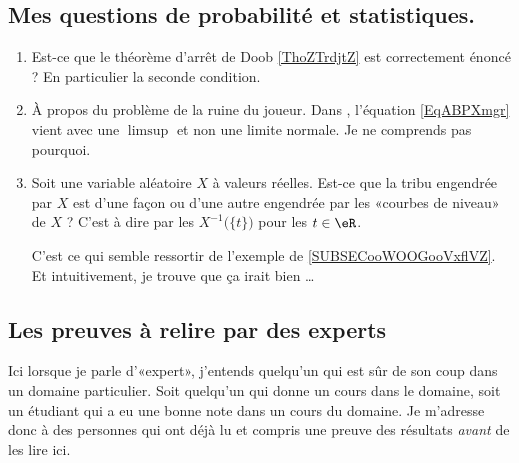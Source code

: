 \subsection{Mes questions de probabilité et statistiques.}

\begin{enumerate}

    \item
        Est-ce que le théorème d'arrêt de Doob \ref{ThoZTrdjtZ} est correctement énoncé ? En particulier la seconde condition. 
    \item
        À propos du problème de la ruine du joueur. Dans \cite{KXjFWKA}, l'équation \eqref{EqABPXmgr} vient avec une \( \limsup\) et non une limite normale. Je ne comprends pas pourquoi.

    \item
        Soit une variable aléatoire \( X\) à valeurs réelles. Est-ce que la tribu engendrée par \( X\) est d'une façon ou d'une autre engendrée par les «courbes de niveau» de \( X\) ? C'est à dire par les \( X^{-1}\big( \{ t \} \big)\) pour les \( t\in \eR\). 

        C'est ce qui semble ressortir de l'exemple de \ref{SUBSECooWOOGooVxflVZ}. Et intuitivement, je trouve que ça irait bien \ldots
\end{enumerate}

 


\subsection{Les preuves à relire par des experts}

Ici lorsque je parle d'«expert», j'entends quelqu'un qui est sûr de son coup dans un domaine particulier. Soit quelqu'un qui donne un cours dans le domaine, soit un étudiant qui a eu une bonne note dans un cours du domaine. Je m'adresse donc à des personnes qui ont déjà lu et compris une preuve des résultats \emph{avant} de les lire ici.


